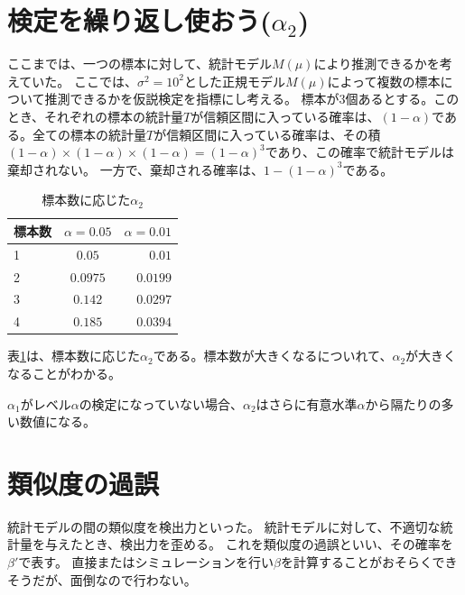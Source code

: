 \section{検定を繰り返し使おう($\alpha_2$)}
ここまでは、一つの標本に対して、統計モデル$M(\mu)$により推測できるかを考えていた。
ここでは、$\sigma^2=10^2$とした正規モデル$M(\mu)$によって複数の標本について推測できるかを仮説検定を指標にし考える。
標本が$3$個あるとする。このとき、それぞれの標本の統計量$T$が信頼区間に入っている確率は、$(1-\alpha)$である。全ての標本の統計量$T$が信頼区間に入っている確率は、その積$(1-\alpha)\times(1-\alpha)\times(1-\alpha)=(1-\alpha)^3$であり、この確率で統計モデルは棄却されない。
一方で、棄却される確率は、$1-(1-\alpha)^3$である。
\begin{table}[hbtp]
    \caption{標本数に応じた$\alpha_2$}
    \label{table:multiple_test_reject_prob}
    \centering
    \begin{tabular}{lcr}
      \hline
      標本数  & $\alpha=0.05$  &  $\alpha=0.01$ \\
      \hline \hline
       1 & $0.05$  & $0.01$ \\
       2 & $0.0975$ & $0.0199$\\
       3 & $0.142$ & $0.0297$\\
       4 & $0.185$ & $0.0394$\\
    \end{tabular}
  \end{table}
表\ref{table:multiple_test_reject_prob}は、標本数に応じた$\alpha_2$である。標本数が大きくなるについれて、$\alpha_2$が大きくなることがわかる。

$\alpha_1$がレベル$\alpha$の検定になっていない場合、$\alpha_2$はさらに有意水準$\alpha$から隔たりの多い数値になる。




\section{類似度の過誤}
統計モデルの間の類似度を検出力といった。
統計モデルに対して、不適切な統計量を与えたとき、検出力を歪める。
これを類似度の過誤といい、その確率を$\beta'$で表す。
直接またはシミュレーションを行い$\beta$を計算することがおそらくできそうだが、面倒なので行わない。



